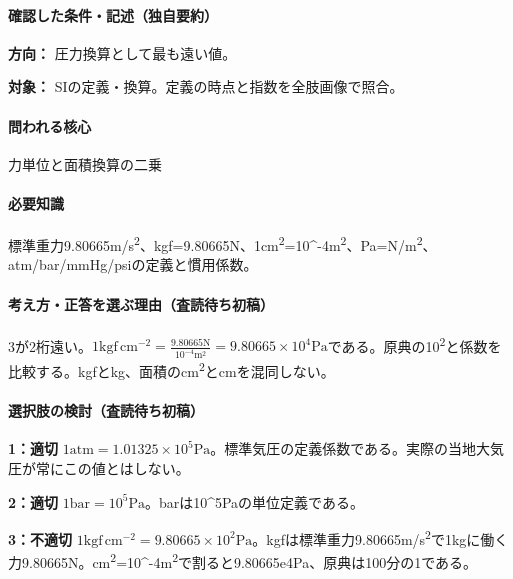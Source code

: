 \paragraph{確認した条件・記述（独自要約）}\mbox{}\par

\noindent\textbf{方向：} 圧力換算として最も遠い値。\par

\noindent\textbf{対象：} SIの定義・換算。定義の時点と指数を全肢画像で照合。\par

\paragraph{問われる核心} 力単位と面積換算の二乗

\paragraph{必要知識} 標準重力9.80665m/s\textsuperscript{2}、kgf=\allowbreak{}9.80665N、1cm\textsuperscript{2}=10\textasciicircum{}-4m\textsuperscript{2}、Pa=\allowbreak{}N/m\textsuperscript{2}、atm/bar/mmHg/psiの定義と慣用係数。

\paragraph{考え方・正答を選ぶ理由（査読待ち初稿）} 3が2桁遠い。\(1\mathrm{kgf\,cm^{-2}}=\frac{9.80665\mathrm{N}}{10^{-4}\mathrm{m^2}}=9.80665\times10^4\mathrm{Pa}\)である。原典の10\textsuperscript{2}と係数を比較する。kgfとkg、面積のcm\textsuperscript{2}とcmを混同しない。

\paragraph{選択肢の検討（査読待ち初稿）}\mbox{}\par

\noindent\textbf{1：適切} \(1\mathrm{atm}=1.01325\times10^5\mathrm{Pa}\)。標準気圧の定義係数である。実際の当地大気圧が常にこの値とはしない。\par

\noindent\textbf{2：適切} \(1\mathrm{bar}=10^5\mathrm{Pa}\)。barは10\textasciicircum{}5Paの単位定義である。\par

\noindent\textbf{3：不適切} \(1\mathrm{kgf\,cm^{-2}}=9.80665\times10^2\mathrm{Pa}\)。kgfは標準重力9.80665m/s\textsuperscript{2}で1kgに働く力9.80665N。cm\textsuperscript{2}=10\textasciicircum{}-4m\textsuperscript{2}で割ると9.80665e4Pa、原典は100分の1である。\par

